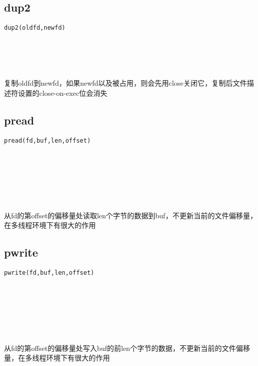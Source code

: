 \documentclass[10pt,a4paper]{article}
\begin{document}
\subsection{dup2}
\begin{spacing}{2.0}
\lstset{language=C,numbers=none}
\begin{lstlisting}
dup2(oldfd,newfd)
\end{lstlisting}
{\large\color[rgb]{0.2,0.4,0.6}{oldfd:}} \\
{\large\color[rgb]{0.2,0.4,0.6}{newfd:}}
\paragraph{ \ \ }复制oldfd到newfd，如果newfd以及被占用，则会先用close关闭它，复制后文件描述符设置的close-on-exec位会消失
\end{spacing}

\subsection{pread}
\begin{spacing}{2.0}
\lstset{language=C,numbers=none}
\begin{lstlisting}
pread(fd,buf,len,offset)
\end{lstlisting}
{\large\color[rgb]{0.2,0.4,0.6}{fd:}} \\
{\large\color[rgb]{0.2,0.4,0.6}{buf:}} \\
{\large\color[rgb]{0.2,0.4,0.6}{len:}} \\
{\large\color[rgb]{0.2,0.4,0.6}{offset:}}
\paragraph{ \ \ }从fd的第offset的偏移量处读取len个字节的数据到buf，不更新当前的文件偏移量，在多线程环境下有很大的作用
\end{spacing}

\subsection{pwrite}
\begin{spacing}{2.0}
\lstset{language=C,numbers=none}
\begin{lstlisting}
pwrite(fd,buf,len,offset)
\end{lstlisting}
{\large\color[rgb]{0.2,0.4,0.6}{fd:}} \\
{\large\color[rgb]{0.2,0.4,0.6}{buf:}} \\
{\large\color[rgb]{0.2,0.4,0.6}{len:}} \\
{\large\color[rgb]{0.2,0.4,0.6}{offset:}}
\paragraph{ \ \ }从fd的第offset的偏移量处写入buf的前len个字节的数据，不更新当前的文件偏移量，在多线程环境下有很大的作用
\end{spacing}
\end{document}
